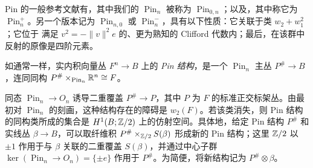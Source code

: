 \begin{note}\label{st:11.15}
Pin 的一般参考文献有，其中我们的 $\operatorname{Pin}_n$ 被称为 $\operatorname{Pin}_{0,\allowbreak n}$；以及，其中称它为 $\operatorname{Pin}_n^+$。另一个版本记为 $\operatorname{Pin}_{n,\allowbreak 0}$ 或 $\operatorname{Pin}_n^-$，具有以下性质：它关联于类 $w_2+w_1^2$；它位于
满足 $v^2=-\|v\|^2e$ 的、更为熟知的 Clifford 代数内；最后，在该群中反射的原像是四阶元素。
\end{note}
\begin{definition*}
如通常一样，实内积向量丛 $F^n\to B$ 上的 \emph{Pin 结构}，是一个 $\operatorname{Pin}_n$ 主丛 $P^\#\to B$，连同同构 $P^\#\times_{\operatorname{Pin}_n}\mathbb R^n\cong F$。
\end{definition*}
同态 $\operatorname{Pin}_n\to O_n$ 诱导二重覆盖 $P^\#\to P$，其中 $P$ 为 $F$ 的标准正交标架丛。由最初对 $\operatorname{Pin}_n$ 的刻画，这种结构存在的障碍是 $w_2(F)$。若该类消失，则 Pin 结构的同构类所成的集合是 $H^1(B;\mathbb Z/2)$ 上的仿射空间。具体地，给定 Pin 结构 $P^\#$ 和实线丛 $\beta\to B$，可以取纤维积 $P^\#\times_{\mathbb Z/2}S(\beta)$ 形成新的 Pin 结构；这里 $\mathbb Z/2$ 以 $\pm1$ 作用于与 $\beta$ 关联的二重覆盖 $S(\beta)$，并通过中心子群 $\ker(\operatorname{Pin}_n\to O_n)=\{\pm e\}$ 作用于 $P^\#$。为简便，将新结构记为 $P^\#\otimes\beta$。

